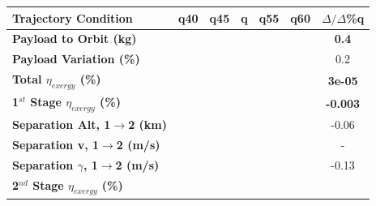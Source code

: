 \begin{table}[ht]
	\centering
\begin{tabular}{l c c c c c c} 
	\hline \textbf{Trajectory Condition}
	&q40
	&q45
	&q
	&q55
	&q60
	& $\Delta/\Delta$\%q
	\\
	\hline \textbf{Payload to Orbit (kg)}
	& \textbf{\PayloadToOrbitqFortyNoReturn}
	& \textbf{\PayloadToOrbitqFortyFiveNoReturn}
	& \textbf{\PayloadToOrbitqStandardNoReturn}
	& \textbf{\PayloadToOrbitqFiftyFiveNoReturn}
	& \textbf{\PayloadToOrbitqSixtyNoReturn}
	&\textbf{0.4}
	\\
	\textbf{Payload Variation (\%)}
	& \PayloadVarqFortyNoReturn
	& \PayloadVarqFortyFiveNoReturn
	& \PayloadVarqStandardNoReturn
	& \PayloadVarqFiftyFiveNoReturn
	& \PayloadVarqSixtyNoReturn
	&0.2
	\\
	\textbf{Total $\eta_{exergy}$ (\%)}
	& \textbf{\totalExergyEffqFortyNoReturn}
	& \textbf{\totalExergyEffqFortyFiveNoReturn}
	& \textbf{\totalExergyEffqStandardNoReturn}
	& \textbf{\totalExergyEffqFiftyFiveNoReturn}
	& \textbf{\totalExergyEffqSixtyNoReturn}
	& \textbf{3e-05}
	\\
	\hline 
	\textbf{1$^{st}$ Stage $\eta_{exergy}$ (\%)}
	& \textbf{\firstExergyEffqFortyNoReturn}
	& \textbf{\firstExergyEffqFortyFiveNoReturn}
	& \textbf{\firstExergyEffqStandardNoReturn}
	& \textbf{\firstExergyEffqFiftyFiveNoReturn}
	& \textbf{\firstExergyEffqSixtyNoReturn}
	& \textbf{-0.003}
	\\
	\textbf{Separation Alt, 1$\rightarrow$2 (km)}
	& \firstsecondSeparationAltqFortyNoReturn
	& \firstsecondSeparationAltqFortyFiveNoReturn
	& \firstsecondSeparationAltqStandardNoReturn
	& \firstsecondSeparationAltqFiftyFiveNoReturn
	& \firstsecondSeparationAltqSixtyNoReturn
	&-0.06
	\\
	\textbf{Separation v, 1$\rightarrow$2 (m/s)}
	& \firstsecondSeparationvqFortyNoReturn
	& \firstsecondSeparationvqFortyFiveNoReturn
	& \firstsecondSeparationvqStandardNoReturn
	& \firstsecondSeparationvqFiftyFiveNoReturn
	& \firstsecondSeparationvqSixtyNoReturn
	& -
	\\
	\textbf{Separation $\gamma$, 1$\rightarrow$2 (m/s)}
	& \firstsecondSeparationgammaqFortyNoReturn
	& \firstsecondSeparationgammaqFortyFiveNoReturn
	& \firstsecondSeparationgammaqStandardNoReturn
	& \firstsecondSeparationgammaqFiftyFiveNoReturn
	& \firstsecondSeparationgammaqSixtyNoReturn
	&-0.13
	\\
	\hline 
	\textbf{2$^{nd}$ Stage $\eta_{exergy}$ (\%)}
	& \textbf{\secondExergyEffqFortyNoReturn}
	& \textbf{\secondExergyEffqFortyFiveNoReturn}

\end{tabular}
\end{table}
